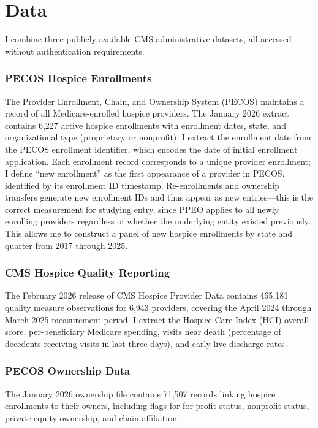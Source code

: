 \documentclass[12pt]{article}
\begin{document}
\section{Data}
\label{sec:data}

I combine three publicly available CMS administrative datasets, all accessed without authentication requirements.

\subsubsection*{PECOS Hospice Enrollments} The Provider Enrollment, Chain, and Ownership System (PECOS) maintains a record of all Medicare-enrolled hospice providers. The January 2026 extract contains 6,227 active hospice enrollments with enrollment dates, state, and organizational type (proprietary or nonprofit). I extract the enrollment date from the PECOS enrollment identifier, which encodes the date of initial enrollment application. Each enrollment record corresponds to a unique provider enrollment; I define ``new enrollment'' as the first appearance of a provider in PECOS, identified by its enrollment ID timestamp. Re-enrollments and ownership transfers generate new enrollment IDs and thus appear as new entries---this is the correct measurement for studying entry, since PPEO applies to all newly enrolling providers regardless of whether the underlying entity existed previously. This allows me to construct a panel of new hospice enrollments by state and quarter from 2017 through 2025.

\subsubsection*{CMS Hospice Quality Reporting} The February 2026 release of CMS Hospice Provider Data contains 465,181 quality measure observations for 6,943 providers, covering the April 2024 through March 2025 measurement period. I extract the Hospice Care Index (HCI) overall score, per-beneficiary Medicare spending, visits near death (percentage of decedents receiving visits in last three days), and early live discharge rates.

\subsubsection*{PECOS Ownership Data} The January 2026 ownership file contains 71,507 records linking hospice enrollments to their owners, including flags for for-profit status, nonprofit status, private equity ownership, and chain affiliation.
\end{document}
